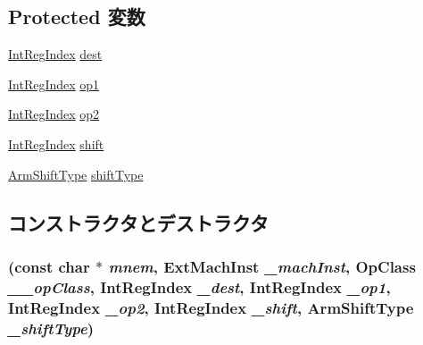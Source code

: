 \subsection*{Protected 変数}
\begin{DoxyCompactItemize}
\item 
\hyperlink{namespaceArmISA_ae64680ba9fb526106829d6bf92fc791b}{IntRegIndex} \hyperlink{classArmISA_1_1DataRegRegOp_aec72e8e45bdc87abeeeb75d2a8a9a716}{dest}
\item 
\hyperlink{namespaceArmISA_ae64680ba9fb526106829d6bf92fc791b}{IntRegIndex} \hyperlink{classArmISA_1_1DataRegRegOp_a4c465c43ad568f8bcf8ae71480e9cfea}{op1}
\item 
\hyperlink{namespaceArmISA_ae64680ba9fb526106829d6bf92fc791b}{IntRegIndex} \hyperlink{classArmISA_1_1DataRegRegOp_a7799ff6cbe5a252199059eb8665820e7}{op2}
\item 
\hyperlink{namespaceArmISA_ae64680ba9fb526106829d6bf92fc791b}{IntRegIndex} \hyperlink{classArmISA_1_1DataRegRegOp_a61b44c23c6631101b7fb207fe6f3c849}{shift}
\item 
\hyperlink{namespaceArmISA_a209d79feaaef0aa2f54ae62e53ee90de}{ArmShiftType} \hyperlink{classArmISA_1_1DataRegRegOp_ae5b7df4bd366c5419743bf5f679485b9}{shiftType}
\end{DoxyCompactItemize}


\subsection{コンストラクタとデストラクタ}
\hypertarget{classArmISA_1_1DataRegRegOp_a7b339ab2ed74e1021bc2e7ae51ec4b46}{
\subsubsection[{DataRegRegOp}]{ (const char $\ast$ {\em mnem}, \/  {\bf ExtMachInst} {\em \_\-machInst}, \/  OpClass {\em \_\-\_\-opClass}, \/  {\bf IntRegIndex} {\em \_\-dest}, \/  {\bf IntRegIndex} {\em \_\-op1}, \/  {\bf IntRegIndex} {\em \_\-op2}, \/  {\bf IntRegIndex} {\em \_\-shift}, \/  {\bf ArmShiftType} {\em \_\-shiftType})}}
\label{classArmISA_1_1DataRegRegOp_a7b339ab2ed74e1021bc2e7ae51ec4b46}



